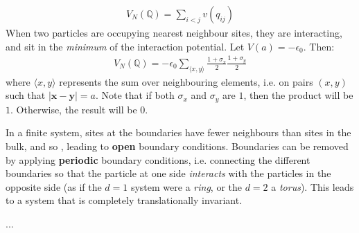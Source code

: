 \documentclass[../template.tex]{subfiles}
\begin{document}
\begin{align*}
    V_N(\mathbb{Q}) = \sum_{i< j} v(q_{ij}) 
\end{align*}
When two particles are occupying nearest neighbour sites, they are interacting, and sit in the \textit{minimum} of the interaction potential. Let $V(a) = -\epsilon_0$. Then:
\begin{align*}
    V_N(\mathbb{Q}) = -\epsilon_0 \sum_{\langle x,y \rangle} \frac{1+\sigma_x}{2} \frac{1+\sigma_y}{2}  
\end{align*}
where $\langle x,y \rangle$ represents the sum over neighbouring elements, i.e. on pairs $(x,y)$ such that $|\bm{x}-\bm{y}| = a$. Note that if both $\sigma_x$ and $\sigma_y$ are $1$, then the product will be $1$. Otherwise, the result will be $0$.

In a finite system, sites at the boundaries have fewer neighbours than sites in the bulk, and so , leading to \textbf{open} boundary conditions. Boundaries can be removed by applying \textbf{periodic} boundary conditions, i.e. connecting the different boundaries so that the particle at one side \textit{interacts} with the particles in the opposite side (as if the $d=1$ system were a \textit{ring}, or the $d=2$ a \textit{torus}). This leads to a system that is completely translationally invariant.   %

...
\end{document}
